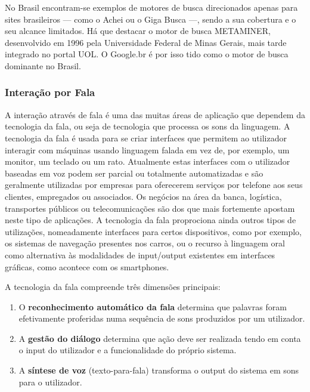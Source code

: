 \begin{multicols}{2}
No Brasil encontram-se exemplos de motores de busca direcionados apenas para sites brasileiros --- como o Achei \cite{achei} ou o Giga Busca \cite{busca} ---, 
sendo a sua cobertura e o seu alcance limitados. Há que destacar o motor de busca METAMINER, desenvolvido em 1996 pela Universidade Federal de Minas Gerais, 
mais tarde integrado no portal UOL. O Google.br é por isso tido como o motor de busca dominante no Brasil. 

  
\subsubsection{Interação por Fala}

A interação através de fala é uma das muitas áreas de aplicação que dependem da tecnologia
da fala, ou seja de tecnologia que processa os sons da linguagem. 
A tecnologia da fala é usada para se criar interfaces que permitem ao utilizador interagir
com máquinas usando linguagem falada em vez de, por exemplo, um monitor, um teclado ou um rato. 
Atualmente estas interfaces com o utilizador baseadas em voz podem ser parcial ou totalmente automatizadas 
e são geralmente utilizadas por empresas para oferecerem serviços por telefone aos seus clientes, empregados ou associados. 
Os negócios na área da banca, logística, transportes públicos ou telecomunicações são dos que mais fortemente 
apostam neste tipo de aplicações. A tecnologia da fala proprociona ainda outros tipos de utilizações, 
nomeadamente interfaces para certos dispositivos, como por exemplo, os sistemas de navegação presentes nos carros, 
ou o recurso à linguagem oral como alternativa às mo\-da\-li\-da\-des de input/output existentes em interfaces gráficas, 
como acontece com os smartphones.



A tecnologia da fala compreende três dimensões principais:

\begin{enumerate}
  \item O \textbf{reconhecimento automático da fala} determina que palavras foram efetivamente proferidas numa sequência de sons produzidos por um utilizador.
      \item A \textbf{gestão do diálogo} determina que ação deve ser realizada tendo em conta o input do utilizador e a funcionalidade do próprio sistema.
      \item A \textbf{síntese de voz} (texto-para-fala) transforma o output do sistema em sons para o utilizador.
\end{enumerate}



\end{multicols}
